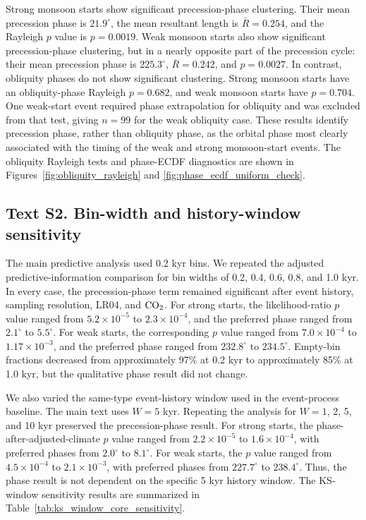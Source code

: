 \documentclass[11pt]{article}
\begin{document}
Strong monsoon starts show significant precession-phase clustering. Their mean precession phase is \(21.9^\circ\), the mean resultant length is \(\bar{R}=0.254\), and the Rayleigh \(p\) value is \(p=0.0019\). Weak monsoon starts also show significant precession-phase clustering, but in a nearly opposite part of the precession cycle: their mean precession phase is \(225.3^\circ\), \(\bar{R}=0.242\), and \(p=0.0027\). In contrast, obliquity phases do not show significant clustering. Strong monsoon starts have an obliquity-phase Rayleigh \(p=0.682\), and weak monsoon starts have \(p=0.704\). One weak-start event required phase extrapolation for obliquity and was excluded from that test, giving \(n=99\) for the weak obliquity case. These results identify precession phase, rather than obliquity phase, as the orbital phase most clearly associated with the timing of the weak and strong monsoon-start events. The obliquity Rayleigh tests and phase-ECDF diagnostics are shown in Figures~\ref{fig:obliquity_rayleigh} and \ref{fig:phase_ecdf_uniform_check}.


\subsection*{Text S2. Bin-width and history-window sensitivity}

The main predictive analysis used 0.2 kyr bins. We repeated the adjusted predictive-information comparison for bin widths of 0.2, 0.4, 0.6, 0.8, and 1.0 kyr. In every case, the precession-phase term remained significant after event history, sampling resolution, LR04, and \(\ce{CO2}\). For strong starts, the likelihood-ratio \(p\) value ranged from \(5.2\times10^{-5}\) to \(2.3\times10^{-4}\), and the preferred phase ranged from \(2.1^\circ\) to \(5.5^\circ\). For weak starts, the corresponding \(p\) value ranged from \(7.0\times10^{-4}\) to \(1.17\times10^{-3}\), and the preferred phase ranged from \(232.8^\circ\) to \(234.5^\circ\). Empty-bin fractions decreased from approximately 97\% at 0.2 kyr to approximately 85\% at 1.0 kyr, but the qualitative phase result did not change.

We also varied the same-type event-history window used in the event-process baseline. The main text uses \(W=5\) kyr. Repeating the analysis for \(W=1\), 2, 5, and 10 kyr preserved the precession-phase result. For strong starts, the phase-after-adjusted-climate \(p\) value ranged from \(2.2\times10^{-5}\) to \(1.6\times10^{-4}\), with preferred phases from \(2.0^\circ\) to \(8.1^\circ\). For weak starts, the \(p\) value ranged from \(4.5\times10^{-4}\) to \(2.1\times10^{-3}\), with preferred phases from \(227.7^\circ\) to \(238.4^\circ\). Thus, the phase result is not dependent on the specific 5 kyr history window. The KS-window sensitivity results are summarized in Table~\ref{tab:ks_window_core_sensitivity}.
\end{document}
